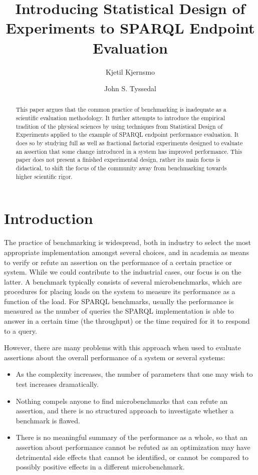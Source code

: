 \documentclass{llncs}
\title{Introducing Statistical Design of Experiments to SPARQL
  Endpoint Evaluation}
\author{Kjetil Kjernsmo\inst{1} \and John S. Tyssedal\inst{2}}
\institute{Department of Informatics,
Postboks 1080 Blindern,
N-0316 Oslo, Norway \email{kjekje@ifi.uio.no} \and Department of Mathematical Sciences,
The Norwegian Institute of Technology,
N-7491 Trondheim,
Norway
\email{john.tyssedal@math.ntnu.no}}
\begin{document}
\maketitle

\begin{abstract}
This paper argues that the common practice of benchmarking is
inadequate as a scientific evaluation methodology. It further attempts
to introduce the empirical tradition of the physical sciences by using
techniques from Statistical Design of Experiments applied to the
example of SPARQL endpoint performance evaluation. It does so by
studying full as well as fractional factorial experiments designed to
evaluate an assertion that some change introduced in a system has
improved performance. This paper does not present a finished
experimental design, rather its main focus is didactical, to shift the
focus of the community away from benchmarking towards higher
scientific rigor.
\end{abstract}

\section{Introduction}

The practice of benchmarking is widespread, both in industry to select
the most appropriate implementation amongst several choices, and in
academia as means to verify or refute an assertion on the performance
of a certain practice or system. While we could contribute to the
industrial cases, our focus is on the latter. A benchmark typically
consists of several microbenchmarks, which are procedures for placing
loads on the system to measure its performance as a function of the
load. For SPARQL benchmarks, usually the performance is measured as 
the number of queries the SPARQL implementation is able to answer in a
certain time (the throughput) or the time required for it to respond
to a query.

However, there are many problems with this approach when used to
evaluate assertions about the overall performance of a system or
several systems: 
\begin{itemize}
\item As the complexity increases, the number of parameters that
one may wish to test increases dramatically.
\item Nothing compels anyone to find microbenchmarks that
  can refute an assertion, and there is no structured approach to
  investigate whether a benchmark is flawed.
\item There is no meaningful summary of the performance as a whole, so
  that an assertion about performance cannot be refuted as an
  optimization may have detrimental side effects that cannot be
  identified, or cannot be compared to possibly positive effects in a
  different microbenchmark.
\end{itemize}
\end{document}
